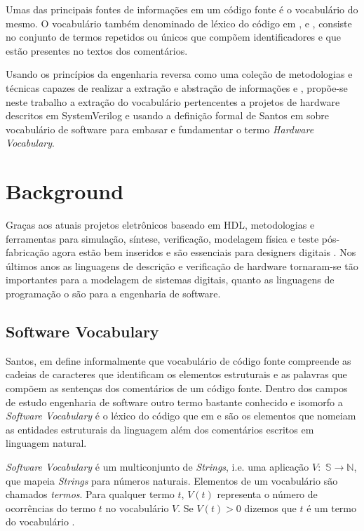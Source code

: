 \documentclass[12pt, twocolumn, a4paper]{article}
\begin{document}
Umas das principais fontes de informações em um código fonte é o vocabulário do mesmo. O vocabulário também denominado de léxico do código em \cite{Host2007}, \cite{Antoniol2007} e \cite{Santos2009}, consiste no conjunto de termos repetidos ou únicos que compõem identificadores e que estão presentes no textos dos comentários\cite{Abebe2009}.

Usando os princípios da engenharia reversa como uma coleção de metodologias e técnicas capazes de realizar a extração e abstração de informações\cite{BENEDUSI1992225} e \cite{Santos2009}, propõe-se neste trabalho a extração do vocabulário pertencentes a projetos de hardware descritos em SystemVerilog e usando a definição formal de Santos em \cite{Santos2015} sobre vocabulário de software para embasar e fundamentar o termo \textit{Hardware Vocabulary}. 

	\section{Background}
\quad Graças aos atuais projetos eletrônicos baseado em HDL, metodologias e ferramentas para simulação, síntese, verificação, modelagem física e teste pós-fabricação agora estão bem inseridos e são essenciais para designers digitais \cite{Navabi2015}. Nos últimos anos as linguagens de descrição e verificação de hardware tornaram-se tão importantes para a modelagem de sistemas digitais, quanto as linguagens de programação o são para a engenharia de software. 
	
	\subsection{Software Vocabulary}
\quad Santos, em \cite{Santos2009} define informalmente que vocabulário de código fonte compreende as cadeias de caracteres que identificam os elementos estruturais e as palavras que compõem as sentenças dos comentários de um código fonte. Dentro dos campos de estudo engenharia de software outro termo bastante conhecido e isomorfo a \textit{Software Vocabulary} é o léxico do código que em \cite{Abebe2009} e \cite{Antoniol2007} são os elementos que nomeiam as entidades estruturais da linguagem além dos comentários escritos em linguagem natural.

 \textit{Software Vocabulary} é um multiconjunto de \textit{Strings}, i.e. uma aplicação $V:$ $\mathbb{S}\rightarrow\mathbb{N}$, que mapeia \textit{Strings} para números naturais. Elementos de um vocabulário são chamados \textit{termos}. Para qualquer termo $t$, $V(t)$ representa o número de ocorrências do termo $t$ no vocabulário $V$. Se $V(t)>0$ dizemos que $t$ é um termo do vocabulário \cite{Santos2015}.
\end{document}
